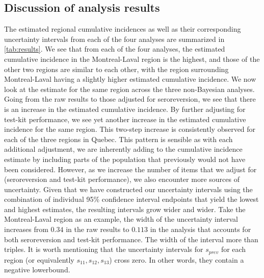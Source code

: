 \subsection{Discussion of analysis results}
The estimated regional cumulative incidences as well as their corresponding uncertainty intervals from each of the four analyses are summarized in \cref{tab:results}. We see that from each of the four analyses, the estimated cumulative incidence in the Montreal-Laval region is the highest, and those of the other two regions are similar to each other, with the region surrounding Montreal-Laval having a slightly higher estimated cumulative incidence. We now look at the estimate for the same region across the three non-Bayesian analyses. Going from the raw results to those adjusted for seroreversion, we see that there is an increase in the estimated cumulative incidence. By further adjusting for test-kit performance, we see yet another increase in the estimated cumulative incidence for the same region. This two-step increase is consistently observed for each of the three regions in Quebec. This pattern is sensible as with each additional adjustment, we are inherently adding to the cumulative incidence estimate by including parts of the population that previously would not have been considered. However, as we increase the number of items that we adjust for (seroreversion and test-kit performance), we also encounter more sources of uncertainty. Given that we have constructed our uncertainty intervals using the combination of individual 95\% confidence interval endpoints that yield the lowest and highest estimates, the resulting intervals grow wider and wider. Take the Montreal-Laval region as an example, the width of the uncertainty interval increases from $0.34$ in the raw results to $0.113$ in the analysis that accounts for both seroreversion and test-kit performance. The width of the interval more than triples. It is worth mentioning that the uncertainty intervals for $s_{prev}$ for each region (or equivalently $s_{11}, s_{12}, s_{13}$) cross zero. In other words, they contain a negative lowerbound.\\
\newline$ $
